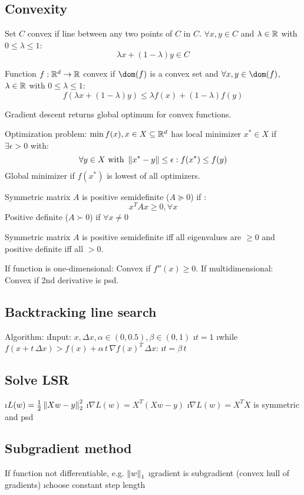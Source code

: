 \subsection{Convexity}

Set $C$ convex if line between any two points of $C$ in $C$. $\forall x,y \in C$ and $\lambda \in \mathbb{R}$ with $0 \leq \lambda \leq 1$: \[\lambda x + (1 - \lambda) y \in C\]

Function $f: \mathbb{R}^d \to \mathbb{R}$ convex if $\dom(f)$ is a convex set and $\forall x,y \in \dom(f)$, $\lambda \in \mathbb{R}$ with $0 \leq \lambda \leq 1$: \[f(\lambda x + (1 - \lambda) y) \leq \lambda f(x) + (1 - \lambda) f(y)\]

Gradient descent returns global optimum for convex functions.

Optimization problem: $\min f(x), x \in X \subseteq \mathbb{R}^d$ has local minimizer $x^* \in X$ if $\exists \epsilon > 0$ with:
\[\forall y \in X \text{ with } \left\lVert x^* - y\right\rVert \leq \epsilon: f(x^*) \leq f(y)\]
Global minimizer if $f(x^*)$ is lowest of all optimizers.

Symmetric matrix $A$ is positive semidefinite ($A \succcurlyeq 0$) if :
\[x^TAx \geq 0, \forall x\]
Positive definite ($A \succ 0$) if $\forall x \neq 0$

Symmetric matrix $A$ is positive semidefinite iff all eigenvalues are $\geq 0$ and positive definite iff all $> 0$.

If function is one-dimensional: Convex if $f''(x) \geq 0$.
If multidimensional: Convex if 2nd derivative is psd.


\subsection{Backtracking line search} %

Algorithm:
\be
\i Input: $x, \Delta x, \alpha \in (0,0.5), \beta \in (0,1)$
\i $t = 1$
\i while $f(x + t \, \Delta x) > f(x) + \alpha \, t \, \nabla f(x)^T \, \Delta x$:
\i \quad $t = \beta \, t$
\ee

\subsection{Solve LSR}

\be
\i $L(w) = \frac{1}{2} \left\lVert Xw-y\right\rVert_2^2$
\i $\nabla L(w) = X^T(Xw-y)$
\i $\nabla L(w) = X^TX$ is symmetric and psd
\ee

\subsection{Subgradient method} %

If function not differentiable, e.g. $\left\lVert w\right\rVert_1$
\bi
\i gradient is subgradient (convex hull of gradients)
\i choose constant step length
\ei